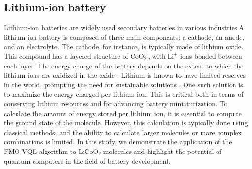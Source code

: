 \documentclass[pdflatex,sn-mathphys-num]{sn-jnl}%
\theoremstyle{thmstyleone}%
\theoremstyle{thmstyletwo}%
\theoremstyle{thmstylethree}%
\begin{document}
\subsection{Lithium-ion battery}\label{subsec2.1}
Lithium-ion batteries are widely used secondary batteries in various industries.A lithium-ion battery is composed of three main components: a cathode, an anode, and an electrolyte. The cathode, for instance, is typically made of lithium oxide. This compound has a layered structure of \(\mathrm{CoO_2^-}\), with \(\mathrm{Li^+}\) ions bonded between each layer. The energy charge of the battery depends on the extent to which the lithium ions are oxidized in the oxide \cite{LI4,LI5}. Lithium is known to have limited reserves in the world, prompting the need for sustainable solutions \cite{LI1}. One such solution is to maximize the energy charged per lithium ion. This is critical both in terms of conserving lithium resources and for advancing battery miniaturization\cite{LI2,LI3}. To calculate the amount of energy stored per lithium ion, it is essential to compute the ground state of the molecule. However, this calculation is typically done using classical methods, and the ability to calculate larger molecules or more complex combinations is limited. In this study, we demonstrate the application of the FMO-VQE algorithm to \(\mathrm{LiCoO_2}\) molecules and highlight the potential of quantum computers in the field of battery development.
\end{document}
